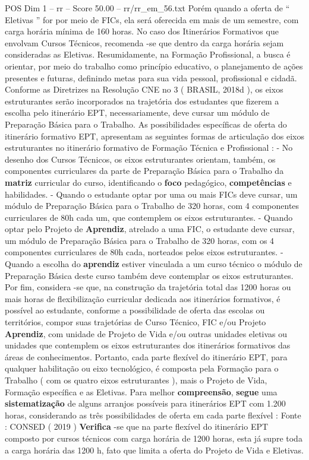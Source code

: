 \begin{textsample}{POS Dim 1 – rr – Score 50.00 – rr/rr\_em\_56.txt}
Porém quando a oferta de “ Eletivas ” for por meio de FICs, ela será oferecida em mais de um semestre, com carga horária mínima de 160 horas.
No caso dos Itinerários Formativos que envolvam Cursos Técnicos, recomenda -se que dentro da carga horária sejam consideradas as Eletivas.
Resumidamente, na Formação Profissional, a busca é orientar, por meio do trabalho como princípio educativo, o planejamento de ações presentes e futuras, definindo metas para sua vida pessoal, profissional e cidadã.
Conforme as Diretrizes na Resolução CNE no 3 ( BRASIL, 2018d ), os eixos estruturantes serão incorporados na trajetória dos estudantes que fizerem a escolha pelo itinerário EPT, necessariamente, deve cursar um módulo de Preparação Básica para o Trabalho.
As possibilidades específicas de oferta do itinerário formativo EPT, apresentam as seguintes formas de articulação dos eixos estruturantes no itinerário formativo de Formação Técnica e Profissional : - No desenho dos Cursos Técnicos, os eixos estruturantes orientam, também, os componentes curriculares da parte de Preparação Básica para o Trabalho da \textbf{matriz} curricular do curso, identificando o \textbf{foco} pedagógico, \textbf{competências} e habilidades. - Quando o estudante optar por uma ou mais FICs deve cursar, um módulo de Preparação Básica para o Trabalho de 320 horas, com 4 componentes curriculares de 80h cada um, que contemplem os eixos estruturantes. - Quando optar pelo Projeto de \textbf{Aprendiz}, atrelado a uma FIC, o estudante deve cursar, um módulo de Preparação Básica para o Trabalho de 320 horas, com os 4 componentes curriculares de 80h cada, norteados pelos eixos estruturantes. - Quando a escolha do \textbf{aprendiz} estiver vinculada a um curso técnico o módulo de Preparação Básica deste curso também deve contemplar os eixos estruturantes.
Por fim, considera -se que, na construção da trajetória total das 1200 horas ou mais horas de flexibilização curricular dedicada aos itinerários formativos, é possível ao estudante, conforme a possibilidade de oferta das escolas ou territórios, compor suas trajetórias de Curso Técnico, FIC e/ou Projeto \textbf{Aprendiz}, com unidade de Projeto de Vida e/ou outras unidades eletivas ou unidades que contemplem os eixos estruturantes dos itinerários formativos das áreas de conhecimentos.
Portanto, cada parte flexível do itinerário EPT, para qualquer habilitação ou eixo tecnológico, é composta pela Formação para o Trabalho ( com os quatro eixos estruturantes ), mais o Projeto de Vida, Formação específica e as Eletivas.
Para melhor \textbf{compreensão}, \textbf{segue} uma \textbf{sistematização} de alguns arranjos possíveis para itinerários EPT com 1.200 horas, considerando as três possibilidades de oferta em cada parte flexível : Fonte : CONSED ( 2019 ) \textbf{Verifica} -se que na parte flexível do itinerário EPT composto por cursos técnicos com carga horária de 1200 horas, esta já supre toda a carga horária das 1200 h, fato que limita a oferta do Projeto de Vida e Eletivas.

\end{textsample}
